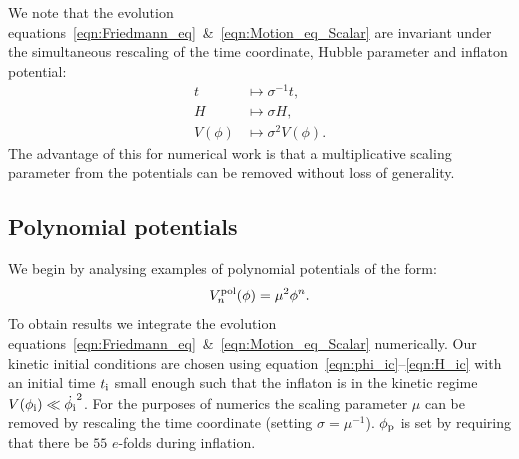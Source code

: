 We note that the evolution equations~\eqref{eqn:Friedmann_eq}~\&~\eqref{eqn:Motion_eq_Scalar} are invariant under  the simultaneous rescaling of the time coordinate, Hubble parameter and inflaton potential:
\begin{align}
  t 
  &\mapsto 
  \sigma^{-1}t,
  \\
  H 
  &\mapsto 
  \sigma H,
  \\
  V(\phi) 
  &\mapsto
  \sigma^2 V(\phi).
\end{align}
The advantage of this for numerical work is that a multiplicative scaling parameter from the potentials can be removed without loss of generality.


\subsection{Polynomial potentials}
\label{sec:section_polynomial_potentials}
We begin by analysing examples of polynomial potentials of the form:
\begin{equation}
  V^\mathrm{pol}_n(\phi) = \mu^2\phi^n.
  \label{eqn:polpot}
\end{equation}
To obtain results we integrate the evolution equations~\eqref{eqn:Friedmann_eq}~\&~\eqref{eqn:Motion_eq_Scalar} numerically.  Our kinetic initial conditions are chosen using equation~\eqref{eqn:phi_ic}--\eqref{eqn:H_ic} with an initial time \(t_{\mathrm{i}}\) small enough such that the inflaton is in the kinetic regime \(V(\phi_{\mathrm{i}})\ll\dot{\phi_{\mathrm{i}}}^2\). For the purposes of numerics the scaling parameter \(\mu\) can be removed by rescaling the time coordinate (setting \(\sigma=\mu^{-1}\)). \(\phi_{\mathrm{p}}\) is set by requiring that there be \(55\) \(e\)-folds during inflation.

